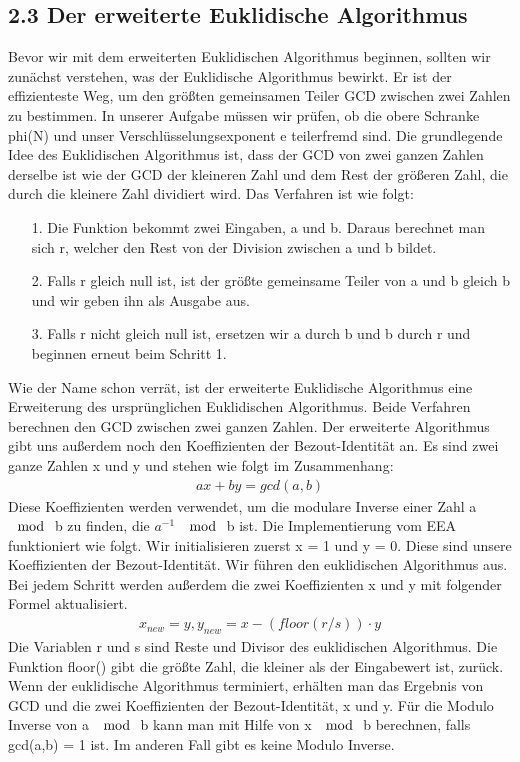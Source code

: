 \documentclass[course=asp]{aspdoc}
\begin{document}
\subsection*{2.3 Der erweiterte Euklidische Algorithmus}
Bevor wir mit dem erweiterten Euklidischen Algorithmus beginnen, sollten wir zunächst verstehen, was der Euklidische Algorithmus bewirkt. Er ist der effizienteste Weg, um den größten gemeinsamen Teiler GCD zwischen zwei Zahlen zu bestimmen. In unserer Aufgabe müssen wir prüfen, ob die obere Schranke phi(N) und unser Verschlüsselungsexponent e teilerfremd sind.
Die grundlegende Idee des Euklidischen Algorithmus ist, dass der GCD von zwei ganzen Zahlen derselbe ist wie der GCD der kleineren Zahl und dem Rest der größeren Zahl, die durch die kleinere Zahl dividiert wird. Das Verfahren ist wie folgt:
\begin{itemize}
 \item [1.] Die Funktion bekommt zwei Eingaben, a und b. Daraus berechnet man sich r, welcher den Rest von der Division zwischen a und b bildet.
 \item [2.] Falls r gleich null ist, ist der größte gemeinsame Teiler von a und b gleich b und wir geben ihn als Ausgabe aus.
 \item [3.] Falls r nicht gleich null ist, ersetzen wir a durch b und b durch r und beginnen erneut beim Schritt 1. 
\end{itemize}
Wie der Name schon verrät, ist der erweiterte Euklidische Algorithmus eine Erweiterung des ursprünglichen Euklidischen Algorithmus. Beide Verfahren berechnen den GCD zwischen zwei ganzen Zahlen. Der erweiterte Algorithmus gibt uns außerdem noch den Koeffizienten der Bezout-Identität an. Es sind zwei ganze Zahlen x und y und stehen wie folgt im Zusammenhang:
\begin{align}
	ax + by = gcd(a, b)
\end{align} 
Diese Koeffizienten werden verwendet, um die modulare Inverse einer Zahl a $\mod$ b zu finden, die $a^{-1}$ $\mod$ b ist.
Die Implementierung vom EEA funktioniert wie folgt. Wir initialisieren zuerst x = 1 und y = 0. Diese sind unsere Koeffizienten der Bezout-Identität. Wir führen den euklidischen Algorithmus aus. Bei jedem Schritt werden außerdem die zwei Koeffizienten x und y mit folgender Formel aktualisiert. 
\begin{align}
	x_{new} = y, y_{new} = x - (floor(r/s)) \cdot y
\end{align} 
Die Variablen r und s sind Reste und Divisor des euklidischen Algorithmus. Die Funktion floor() gibt die größte Zahl, die kleiner als der Eingabewert ist, zurück. 
Wenn der euklidische Algorithmus terminiert, erhälten man das Ergebnis von GCD und die zwei Koeffizienten der Bezout-Identität, x und y. Für die Modulo Inverse von a $\mod$ b kann man mit Hilfe von x $\mod$ b berechnen, falls gcd(a,b) = 1 ist. Im anderen Fall gibt es keine Modulo Inverse.
\end{document}

